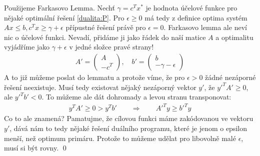 \dk Použijeme Farkasovo Lemma. Nechť $\gamma = c^Tx^*$ je hodnota účelové funkce
pro nějaké optimální řešení \eqref{dualita:P}. Pro $\epsilon \geq 0$ má tedy z
definice optima systém $Ax \leq b, c^Tx \geq \gamma + \epsilon$ přípustné řešení právě pro
$\epsilon = 0$. Farkasovo lemma ale neví nic o účelové funkci. Nevadí, přidáme
ji jako řádek do naší matice $A$ a optimalitu vyjádříme jako $\gamma + \epsilon$
v jedné složce pravé strany!
\begin{align}
	A' = \left(\begin{array}{c} A \\ -c^T \end{array}\right), \quad b' =
	\left(\begin{array}{c} b \\ -\gamma - \epsilon\end{array}\right)
\end{align}
A to již můžeme poslat do lemmatu a protože víme, že pro $\epsilon > 0$ žádné
nezáporné řešení neexistuje. Musí tedy existovat nějaký nezáporný vektor $y'$, že
$y'^TA' \geq 0$, ale $y'^T b' < 0$. To můžeme ale dát dohromady a levou stranu
transponovat:
\begin{align}
	y^TA' \geq 0 > y^T b' \qquad \Rightarrow \qquad
	A'^Ty \geq b'^T y
\end{align}
Co to ale znamená? Pamatujme, že cílovou funkci máme zakódovanou ve vektoru
$y'$, dává nám to tedy nějaké řešení duálního programu, které je jenom o epsilon
menší, než optimum primáru. Protože to můžeme udělat pro libovolně malé
$\epsilon$, musí si být rovny. \qed
